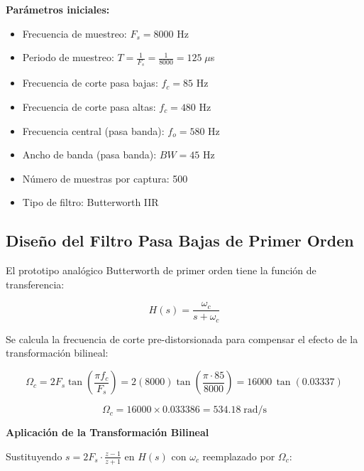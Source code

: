 \textbf{Parámetros iniciales:}

\begin{itemize}
    \item Frecuencia de muestreo: $F_s = 8000$ Hz
    \item Periodo de muestreo: $T = \frac{1}{F_s} = \frac{1}{8000} = 125\;\mu$s
    \item Frecuencia de corte pasa bajas: $f_c = 85$ Hz
    \item Frecuencia de corte pasa altas: $f_c = 480$ Hz
    \item Frecuencia central (pasa banda): $f_o = 580$ Hz
    \item Ancho de banda (pasa banda): $BW = 45$ Hz
    \item Número de muestras por captura: 500
    \item Tipo de filtro: Butterworth IIR
\end{itemize}

\subsection{Diseño del Filtro Pasa Bajas de Primer Orden}


El prototipo analógico Butterworth de primer orden tiene la función de transferencia:

\begin{equation}
    H(s) = \frac{\omega_c}{s + \omega_c}
    \label{eq:lp_analog}
\end{equation}


Se calcula la frecuencia de corte pre-distorsionada para compensar el efecto de la transformación bilineal:

\begin{equation}
    \Omega_c = 2 F_s \tan\!\left(\frac{\pi f_c}{F_s}\right) = 2(8000)\tan\!\left(\frac{\pi \cdot 85}{8000}\right) = 16000\,\tan(0.03337)
\end{equation}

\begin{equation}
    \Omega_c = 16000 \times 0.033386 = 534.18 \;\text{rad/s}
\end{equation}

\textbf{Aplicación de la Transformación Bilineal}

Sustituyendo $s = 2F_s\cdot\frac{z-1}{z+1}$ en $H(s)$ con $\omega_c$ reemplazado por $\Omega_c$:

